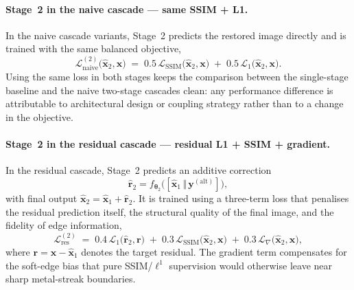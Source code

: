 \paragraph{Stage~2 in the naive cascade --- same SSIM + L1.}
In the naive cascade variants, Stage~2 predicts the restored image directly and is trained with the same balanced objective,
\begin{equation}
    \mathcal{L}^{(2)}_{\mathrm{naive}}\!\bigl(\hat{\mathbf{x}}_{2}, \mathbf{x}\bigr)
    \;=\; 0.5\,\mathcal{L}_{\mathrm{SSIM}}\!\bigl(\hat{\mathbf{x}}_{2}, \mathbf{x}\bigr)
    \;+\; 0.5\,\mathcal{L}_{1}\!\bigl(\hat{\mathbf{x}}_{2}, \mathbf{x}\bigr).
    \label{eq:meth_loss_naive_stage2}
\end{equation}
Using the same loss in both stages keeps the comparison between the single-stage baseline and the naive two-stage cascades clean: any performance difference is attributable to architectural design or coupling strategy rather than to a change in the objective.

\paragraph{Stage~2 in the residual cascade --- residual L1 + SSIM + gradient.}
In the residual cascade, Stage~2 predicts an additive correction
\[
    \hat{\mathbf{r}}_{2}
    = f_{\boldsymbol{\theta}_{2}}\!\bigl([\hat{\mathbf{x}}_{1}\,\Vert\,\mathbf{y}^{(\mathrm{alt})}]\bigr),
\]
with final output \(\hat{\mathbf{x}}_{2}=\hat{\mathbf{x}}_{1}+\hat{\mathbf{r}}_{2}\). It is trained using a three-term loss that penalises the residual prediction itself, the structural quality of the final image, and the fidelity of edge information,
\begin{equation}
    \mathcal{L}^{(2)}_{\mathrm{res}}
    \;=\; 0.4\,\mathcal{L}_{1}\!\bigl(\hat{\mathbf{r}}_{2}, \mathbf{r}\bigr)
    \;+\; 0.3\,\mathcal{L}_{\mathrm{SSIM}}\!\bigl(\hat{\mathbf{x}}_{2}, \mathbf{x}\bigr)
    \;+\; 0.3\,\mathcal{L}_{\nabla}\!\bigl(\hat{\mathbf{x}}_{2}, \mathbf{x}\bigr),
    \label{eq:meth_loss_residual}
\end{equation}
where \(\mathbf{r}=\mathbf{x}-\hat{\mathbf{x}}_{1}\) denotes the target residual. The gradient term compensates for the soft-edge bias that pure SSIM/\(\ell^{1}\) supervision would otherwise leave near sharp metal-streak boundaries.


